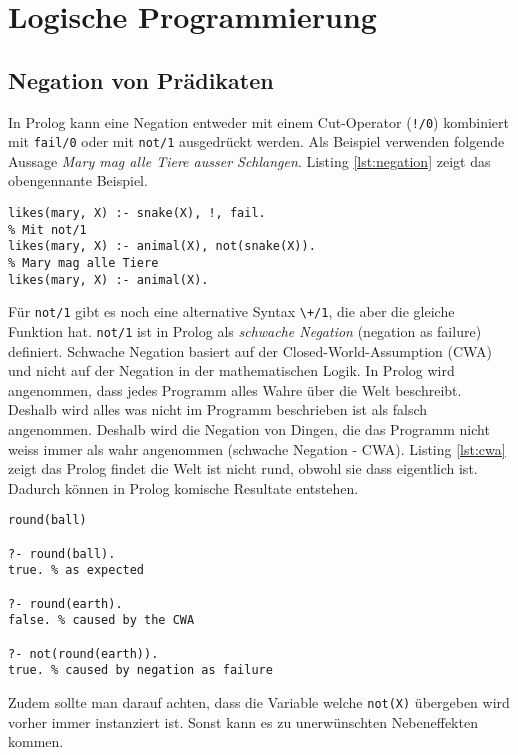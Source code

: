\chapter{Logische Programmierung}

\section{Negation von Prädikaten}

In Prolog kann eine Negation entweder mit einem Cut-Operator (\verb|!/0|) kombiniert mit \verb|fail/0| oder mit \verb|not/1| ausgedrückt werden. Als Beispiel verwenden folgende Aussage \textit{Mary mag alle Tiere ausser Schlangen}. Listing \ref{lst:negation} zeigt das obengennante Beispiel.

\begin{lstlisting}[caption=Negation, label=lst:negation]
% Wenn X eine Schlange unterbreche Backtracking und Regel ist falsch
likes(mary, X) :- snake(X), !, fail.
% Mit not/1
likes(mary, X) :- animal(X), not(snake(X)).
% Mary mag alle Tiere
likes(mary, X) :- animal(X).
\end{lstlisting}

Für \verb|not/1| gibt es noch eine alternative Syntax \verb|\+/1|, die aber die gleiche Funktion hat. \verb|not/1| ist in Prolog als \textit{schwache Negation} (negation as failure) definiert. Schwache Negation basiert auf der Closed-World-Assumption (CWA) und nicht auf der Negation in der mathematischen Logik. In Prolog wird angenommen, dass jedes Programm alles Wahre über die Welt beschreibt. Deshalb wird alles was nicht im Programm beschrieben ist als falsch angenommen. Deshalb wird die Negation von Dingen, die das Programm nicht weiss immer als wahr angenommen (schwache Negation - CWA). Listing \ref{lst:cwa} zeigt das Prolog findet die Welt ist nicht rund, obwohl sie dass eigentlich ist. Dadurch können in Prolog komische Resultate entstehen.

\begin{lstlisting}[caption=CWA, label=lst:cwa]
round(ball)

?- round(ball).
true. % as expected

?- round(earth).
false. % caused by the CWA

?- not(round(earth)).
true. % caused by negation as failure
\end{lstlisting}

Zudem sollte man darauf achten, dass die Variable welche \verb|not(X)| übergeben wird vorher immer instanziert ist. Sonst kann es zu unerwünschten Nebeneffekten kommen.

